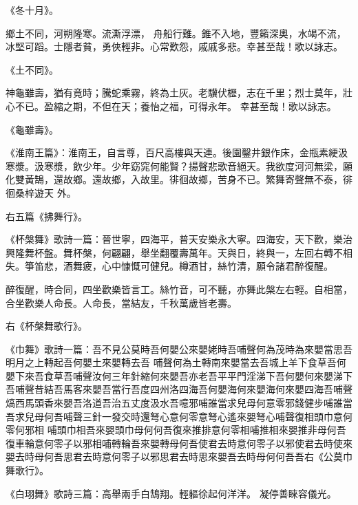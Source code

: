 \begin{pinyinscope}
 《冬十月》。



 鄉土不同，河朔隆寒。流澌浮漂，
 舟船行難。錐不入地，豐籟深奧，水竭不流，冰堅可蹈。士隱者貧，勇俠輕非。心常歎怨，戚戚多悲。幸甚至哉！歌以詠志。



 《土不同》。



 神龜雖壽，猶有竟時；騰蛇乘霧，終為土灰。老驥伏櫪，志在千里；烈士莫年，壯心不已。盈縮之期，不但在天；養怡之福，可得永年。
 幸甚至哉！歌以詠志。



 《龜雖壽》。



 《淮南王篇》：淮南王，自言尊，百尺高樓與天連。後園鑿井銀作床，金瓶素綆汲寒漿。汲寒漿，飲少年。少年窈窕何能賢？揚聲悲歌音絕天。我欲度河河無梁，願化雙黃鵠，還故鄉。還故鄉，入故里。徘徊故鄉，苦身不已。繁舞寄聲無不泰，徘徊桑梓遊天
 外。



 右五篇《拂舞行》。



 《杯槃舞》歌詩一篇：晉世寧，四海平，普天安樂永大寧。四海安，天下歡，樂治興隆舞杯盤。舞杯槃，何翩翩，舉坐翻覆壽萬年。天與日，終與一，左回右轉不相失。箏笛悲，酒舞疲，心中慷慨可健兒。樽酒甘，絲竹清，願令諸君醉復醒。



 醉復醒，時合同，四坐歡樂皆言工。絲竹音，可不聽，亦舞此槃左右輕。自相當，合坐歡樂人命長。人命長，當結友，千秋萬歲皆老壽。



 右《杯槃舞歌行》。



 《巾舞》歌詩一篇：吾不見公莫時吾何嬰公來嬰姥時吾哺聲何為茂時為來嬰當思吾明月之上轉起吾何嬰土來嬰轉去吾
 哺聲何為土轉南來嬰當去吾城上羊下食草吾何嬰下來吾食草吾哺聲汝何三年針縮何來嬰吾亦老吾平平門淫涕下吾何嬰何來嬰涕下吾哺聲昔結吾馬客來嬰吾當行吾度四州洛四海吾何嬰海何來嬰海何來嬰四海吾哺聲熇西馬頭香來嬰吾洛道吾治五丈度汲水吾噫邪哺誰當求兒母何意零邪錢健步哺誰當吾求兒母何吾哺聲三針一發交時還弩心意何零意弩心遙來嬰弩心哺聲復相頭巾意何零何邪相
 哺頭巾相吾來嬰頭巾母何何吾復來推排意何零相哺推相來嬰推非母何吾復車輪意何零子以邪相哺轉輪吾來嬰轉母何吾使君去時意何零子以邪使君去時使來嬰去時母何吾思君去時意何零子以邪思君去時思來嬰吾去時母何何吾吾右《公莫巾舞歌行》。



 《白珝舞》歌詩三篇：高舉兩手白鵠翔。輕軀徐起何洋洋。
 凝停善睞容儀光。




\end{pinyinscope}
